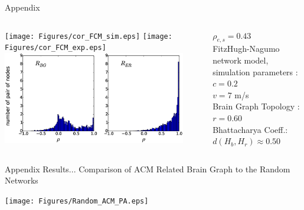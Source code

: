 \documentclass{beamer}
\begin{document}
\begin{frame}{Appendix}


  \begin{columns}[T] %
     \begin{column}[T]{8cm} %
 	
 	\texttt{[image: Figures/cor\_FCM\_sim.eps]} 
    \texttt{[image: Figures/cor\_FCM\_exp.eps]} \\
    \includegraphics[width=8cm]{Figures/discuss_1.eps}
   
 
 
      \end{column}
     
     \begin{column}[T]{4cm} 
	  $\rho_{e,s}=0.43$ \\    
	  FitzHugh-Nagumo network model, \\
	  simulation parameters : \\
      $c=0.2$ \\
      $v=7$ m/s \\
      Brain Graph Topology : \\
      $r=0.60$ \\ 
	  \break
	  \break
	  Bhattacharya Coeff.: \\
	  $d(H_b, H_r) \approx 0.50$  
     \end{column}
  
  \end{columns}




 




\end{frame}



\begin{frame}{Appendix}
Results...
\footnotesize{Comparison of ACM Related Brain Graph to the Random Networks}

\texttt{[image: Figures/Random\_ACM\_PA.eps]}

\end{frame}
\end{document}
